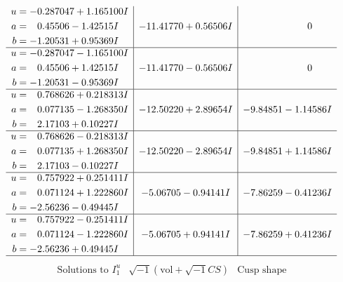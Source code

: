 \documentclass[1p]{elsarticle_modified}
\theoremstyle{definition}
\newcommand{\I}{\sqrt{-1}}
\begin{document}
$$\begin{array}{c|c|c}
\begin{aligned}
u &= -0.287047 + 1.165100 I \\
a &= \phantom{-}0.45506 - 1.42515 I \\
b &= -1.20531 + 0.95369 I\end{aligned}
 & -11.41770 + 0.56506 I & \phantom{-0.000000 } 0 \\ \hline\begin{aligned}
u &= -0.287047 - 1.165100 I \\
a &= \phantom{-}0.45506 + 1.42515 I \\
b &= -1.20531 - 0.95369 I\end{aligned}
 & -11.41770 - 0.56506 I & \phantom{-0.000000 } 0 \\ \hline\begin{aligned}
u &= \phantom{-}0.768626 + 0.218313 I \\
a &= \phantom{-}0.077135 - 1.268350 I \\
b &= \phantom{-}2.17103 + 0.10227 I\end{aligned}
 & -12.50220 + 2.89654 I & -9.84851 - 1.14586 I \\ \hline\begin{aligned}
u &= \phantom{-}0.768626 - 0.218313 I \\
a &= \phantom{-}0.077135 + 1.268350 I \\
b &= \phantom{-}2.17103 - 0.10227 I\end{aligned}
 & -12.50220 - 2.89654 I & -9.84851 + 1.14586 I \\ \hline\begin{aligned}
u &= \phantom{-}0.757922 + 0.251411 I \\
a &= \phantom{-}0.071124 + 1.222860 I \\
b &= -2.56236 - 0.49445 I\end{aligned}
 & -5.06705 - 0.94141 I & -7.86259 - 0.41236 I \\ \hline\begin{aligned}
u &= \phantom{-}0.757922 - 0.251411 I \\
a &= \phantom{-}0.071124 - 1.222860 I \\
b &= -2.56236 + 0.49445 I\end{aligned}
 & -5.06705 + 0.94141 I & -7.86259 + 0.41236 I\\
 \hline 
 \end{array}$$\newpage$$\begin{array}{c|c|c}  
\text{Solutions to }I^u_{1}& \I (\text{vol} + \sqrt{-1}CS) & \text{Cusp shape}\\
 \hline 
\begin{aligned}

\end{aligned}
\end{array}$$
\end{document}
